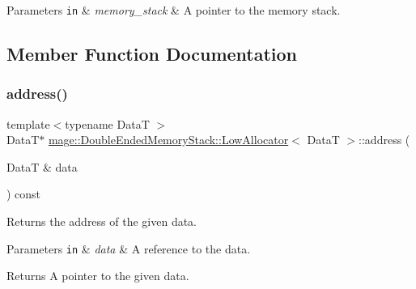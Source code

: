 \begin{DoxyParams}[1]{Parameters}
\mbox{\tt in}  & {\em memory\+\_\+stack} & A pointer to the memory stack. \\
\hline
\end{DoxyParams}


\subsection{Member Function Documentation}
\hypertarget{structmage_1_1_double_ended_memory_stack_1_1_low_allocator_a5c8652dba997772c31e4d9fe3544d800}{}\label{structmage_1_1_double_ended_memory_stack_1_1_low_allocator_a5c8652dba997772c31e4d9fe3544d800} 
\subsubsection{\texorpdfstring{address()}{address()}\hspace{0.1cm}{\footnotesize\ttfamily [1/2]}}
{\footnotesize\ttfamily template$<$typename DataT $>$ \\
DataT$\ast$ \hyperlink{structmage_1_1_double_ended_memory_stack_1_1_low_allocator}{mage\+::\+Double\+Ended\+Memory\+Stack\+::\+Low\+Allocator}$<$ DataT $>$\+::address (\begin{DoxyParamCaption}\item[{DataT \&}]{data }\end{DoxyParamCaption}) const\hspace{0.3cm}{\ttfamily [noexcept]}}

Returns the address of the given data.


\begin{DoxyParams}[1]{Parameters}
\mbox{\tt in}  & {\em data} & A reference to the data. \\
\hline
\end{DoxyParams}
\begin{DoxyReturn}{Returns}
A pointer to the given data. 
\end{DoxyReturn}
\hypertarget{structmage_1_1_double_ended_memory_stack_1_1_low_allocator_a2534642d00a890a97b262c47388c2c60}{}\label{structmage_1_1_double_ended_memory_stack_1_1_low_allocator_a2534642d00a890a97b262c47388c2c60} 
